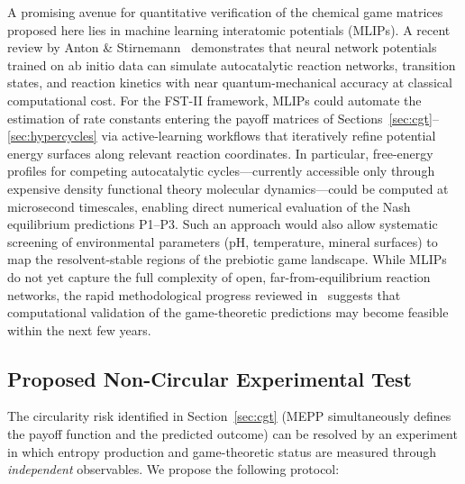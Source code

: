 \documentclass[12pt,a4paper]{article}
\theoremstyle{remark}
\begin{document}
A promising avenue for quantitative verification of the chemical game matrices proposed here lies in machine learning interatomic potentials (MLIPs). A recent review by Anton \& Stirnemann~\citep{AntonStirnemann2026} demonstrates that neural network potentials trained on ab initio data can simulate autocatalytic reaction networks, transition states, and reaction kinetics with near quantum-mechanical accuracy at classical computational cost. For the FST-II framework, MLIPs could automate the estimation of rate constants entering the payoff matrices of Sections~\ref{sec:cgt}--\ref{sec:hypercycles} via active-learning workflows that iteratively refine potential energy surfaces along relevant reaction coordinates. In particular, free-energy profiles for competing autocatalytic cycles---currently accessible only through expensive density functional theory molecular dynamics---could be computed at microsecond timescales, enabling direct numerical evaluation of the Nash equilibrium predictions P1--P3. Such an approach would also allow systematic screening of environmental parameters (pH, temperature, mineral surfaces) to map the resolvent-stable regions of the prebiotic game landscape. While MLIPs do not yet capture the full complexity of open, far-from-equilibrium reaction networks, the rapid methodological progress reviewed in~\citep{AntonStirnemann2026} suggests that computational validation of the game-theoretic predictions may become feasible within the next few years.

\subsection{Proposed Non-Circular Experimental Test}
\label{sec:noncircular-test}

The circularity risk identified in Section~\ref{sec:cgt} (MEPP simultaneously defines the payoff function and the predicted outcome) can be resolved by an experiment in which entropy production and game-theoretic status are measured through \emph{independent} observables. We propose the following protocol:
\end{document}
